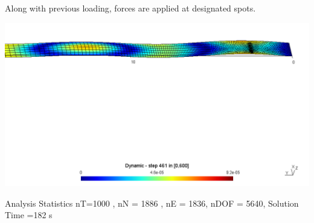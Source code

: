 \documentclass[9pt]{beamer}
\begin{document}
\begin{frame}
Along with previous loading, forces are applied at designated spots.

\begin{figure}[h!]
\centering

\end{figure}
\href{run:movie2.mpg}{\includegraphics[width=1.0\textwidth,trim={0cm 15cm 0cm 1cm},clip]{ParaStudy_onlydata/for.png}}



\begin{block}{Analysis Statistics}
nT=1000 , nN = 1886 , nE = 1836, nDOF = 5640, Solution Time =182 s

\end{block}


\end{frame}
\end{document}
